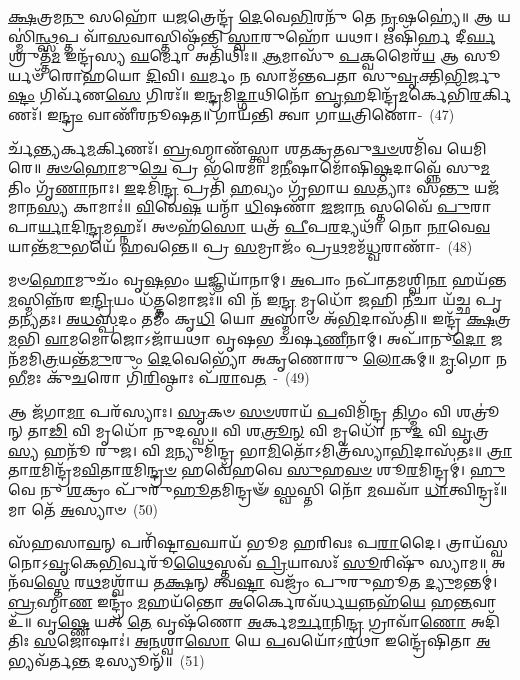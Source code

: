 \-\ul{𑌕𑍍𑌷}\-𑌤𑍍𑌰𑌮\-\ul{𑌨𑍁} 𑌸𑌹𑍋᳴ 𑌯\-\ul{𑌜}\-𑌤𑍍𑌰𑍇𑌨𑍍𑌦𑍍𑌰᳴ \ul{𑌦𑍇}\-𑌵𑍇\-\ul{𑌭𑌿}\-𑌰𑌨𑍁᳴ 𑌤𑍇 \ul{𑌨𑍃}\-𑌷𑌹𑍍𑌯𑍇॑॥ 𑌆 𑌯𑌸𑍍𑌮𑌿॑\-\ul{𑌨𑍍𑌥𑍍𑌸}\-𑌪𑍍𑌤 𑌵𑌾᳴\-\ul{𑌸}\-𑌵𑌾𑌸𑍍𑌤𑌿𑌷𑍍𑌠᳴𑌨𑍍𑌤𑌿 \ul{𑌸𑍍𑌵𑌾}\-𑌰𑍁𑌹𑍋᳴ 𑌯𑌥𑌾। 𑌋𑌷𑌿᳴𑌰𑍍\mbox{}𑌹 𑌦𑍀\-\ul{𑌰𑍍𑌘}\-𑌶𑍍𑌰𑍁𑌤𑍍𑌤᳴\-\ul{𑌮} 𑌇𑌨𑍍𑌦𑍍𑌰᳴𑌸𑍍𑌯 \ul{𑌘}\-𑌰𑍍𑌮𑍋 𑌅𑌤𑌿᳴𑌥𑌿𑌃॥ \ul{𑌆}\-𑌮𑌾𑌸𑍁᳴ \ul{𑌪}\-𑌕𑍍𑌵𑌮𑍈𑌰᳴\-\ul{𑌯} 𑌆 𑌸𑍂𑌰𑍍𑌯𑍞᳴ 𑌰𑍋𑌹𑌯𑍋 \ul{𑌦𑌿}\-𑌵𑌿। \ul{𑌘}\-𑌰𑍍𑌮𑌂 𑌨 𑌸𑌾𑌮᳴𑌨𑍍𑌤𑌪𑌤𑌾 𑌸𑍁\-\ul{𑌵𑍃}\-𑌕𑍍𑌤𑌿\-\ul{𑌭𑌿}\-𑌰𑍍𑌜𑍁\-\ul{𑌷𑍍𑌟𑌂} 𑌗𑌿𑌰𑍍𑌵᳴𑌣\-\ul{𑌸𑍇} 𑌗𑌿𑌰𑌃᳴॥ 𑌇\-\ul{𑌨𑍍𑌦𑍍𑌰}\-𑌮𑌿\-\ul{𑌦𑍍𑌗𑌾}\-𑌥𑌿𑌨𑍋᳴ \ul{𑌬𑍃}\-𑌹𑌦𑌿𑌨𑍍𑌦𑍍𑌰᳴\-\ul{𑌮}\-𑌰𑍍𑌕𑍇𑌭𑌿᳴\-\ul{𑌰}\-𑌰𑍍𑌕𑌿𑌣𑌃᳴। 𑌇\-\ul{𑌨𑍍𑌦𑍍𑌰𑌂} 𑌵𑌾𑌣𑍀᳴𑌰𑌨𑍂𑌷𑌤॥ 𑌗𑌾𑌯᳴𑌨𑍍𑌤𑌿 𑌤𑍍𑌵𑌾 𑌗𑌾\-\ul{𑌯}\-𑌤𑍍𑌰𑌿𑌣𑍋-~(47)

𑌰𑍍𑌚᳴\-\ul{𑌨𑍍𑌤𑍍𑌯}\-𑌰𑍍𑌕\-\ul{𑌮}\-𑌰𑍍𑌕𑌿𑌣𑌃᳴। \ul{𑌬𑍍𑌰}\-𑌹𑍍𑌮𑌾𑌣᳴𑌸𑍍𑌤𑍍𑌵𑌾 𑌶𑌤𑌕𑍍𑌰\-\ul{𑌤}\-𑌵𑍁\-\ul{𑌦𑍍𑌵}\-\-\ul{𑍞}\-𑌶𑌮𑌿᳴𑌵 𑌯𑍇𑌮𑌿𑌰𑍇॥ \ul{𑌅}\-\-\ul{𑍞}\-\-\ul{𑌹𑍋}\-𑌮𑍁\-\ul{𑌚𑍇} 𑌪𑍍𑌰 𑌭᳴𑌰𑍇𑌮𑌾 𑌮\-\ul{𑌨𑍀}\-𑌷𑌾𑌮𑍋᳴𑌷𑌿\-\ul{𑌷𑍍𑌠}\-𑌦𑌾𑌵𑍍𑌨𑍍𑌨𑍇᳴ 𑌸𑍁\-\ul{𑌮}\-𑌤𑌿𑌂 𑌗𑍃᳴\-\ul{𑌣𑌾}\-𑌨𑌾𑌃। \ul{𑌇}\-𑌦𑌮𑌿᳴\-\ul{𑌨𑍍𑌦𑍍𑌰} 𑌪𑍍𑌰𑌤𑌿᳴ \ul{𑌹}\-𑌵𑍍𑌯𑌂 𑌗𑍃᳴𑌭𑌾𑌯 \ul{𑌸}\-𑌤𑍍𑌯𑌾𑌃 𑌸᳴\-\ul{𑌨𑍍𑌤𑍁} 𑌯𑌜᳴𑌮𑌾𑌨\-\ul{𑌸𑍍𑌯} 𑌕𑌾𑌮𑌾𑌃॑॥ \ul{𑌵𑌿}\-𑌵𑍇\-\ul{𑌷} 𑌯𑌨𑍍𑌮𑌾᳴ \ul{𑌧𑌿}\-𑌷𑌣𑌾᳴ \ul{𑌜}\-𑌜𑌾\-\ul{𑌨} 𑌸𑍍𑌤𑌵𑍈᳴ \ul{𑌪𑍁}\-𑌰𑌾 𑌪𑌾\-\ul{𑌰𑍍𑌯𑌾}\-𑌦𑌿\-\ul{𑌨𑍍𑌦𑍍𑌰}\-𑌮𑌹𑍍𑌨𑌃᳴। 𑌅𑍞𑌹᳴\-\ul{𑌸𑍋} 𑌯𑌤𑍍𑌰᳴ \ul{𑌪𑍀}\-𑌪\-\ul{𑌰}\-𑌦𑍍𑌯𑌥𑌾᳴ 𑌨𑍋 \ul{𑌨𑌾}\-𑌵𑍇\-\ul{𑌵} 𑌯𑌾𑌨𑍍𑌤᳴\-\ul{𑌮𑍁}\-𑌭𑌯𑍇᳴ 𑌹𑌵𑌨𑍍𑌤𑍇॥ 𑌪𑍍𑌰 \ul{𑌸}\-𑌮𑍍𑌰𑌾𑌜𑌂᳴ 𑌪𑍍𑌰\-\ul{𑌥}\-𑌮𑌮᳴\-\ul{𑌧𑍍𑌵}\-𑌰𑌾𑌣𑌾᳴-~(48)

𑌮𑍞\-\ul{𑌹𑍋}\-𑌮𑍁𑌚𑌂᳴ 𑌵𑍃\-\ul{𑌷}\-𑌭𑌂 \ul{𑌯}\-𑌜𑍍𑌞𑌿𑌯𑌾᳴𑌨𑌾𑌮𑍍। \ul{𑌅}\-𑌪𑌾𑌂 𑌨𑌪𑌾᳴𑌤𑌮𑌶𑍍𑌵𑌿\-\ul{𑌨𑌾} 𑌹𑌯᳴𑌨𑍍𑌤\-\ul{𑌮}\-𑌸𑍍𑌮𑌿𑌨𑍍𑌨᳴𑌰 𑌇\-\ul{𑌨𑍍𑌦𑍍𑌰𑌿}\-𑌯𑌂 𑌧᳴\-\ul{𑌤𑍍𑌤}\-𑌮𑍋𑌜𑌃᳴॥ 𑌵𑌿 𑌨᳴ 𑌇\-\ul{𑌨𑍍𑌦𑍍𑌰} 𑌮𑍃𑌧𑍋᳴ 𑌜𑌹𑌿 \ul{𑌨𑍀}\-𑌚𑌾 𑌯᳴𑌚𑍍𑌛 𑌪𑍃𑌤\-\ul{𑌨𑍍𑌯}\-𑌤𑌃। \ul{𑌅}\-\-\ul{𑌧}\-\-\ul{𑌸𑍍𑌪}\-𑌦𑌂 𑌤𑌮𑍀𑌂॑ 𑌕𑍃\-\ul{𑌧𑌿} 𑌯𑍋 \ul{𑌅}\-𑌸𑍍𑌮𑌾𑍞 𑌅᳴\-\ul{𑌭𑌿}\-𑌦𑌾𑌸᳴𑌤𑌿॥ 𑌇𑌨𑍍𑌦𑍍𑌰᳴ \ul{𑌕𑍍𑌷}\-𑌤𑍍𑌰\-\ul{𑌮}\-𑌭𑌿 \ul{𑌵𑌾}\-𑌮𑌮𑍋𑌜𑍋\-𑌽𑌜𑌾᳴𑌯𑌥𑌾 𑌵𑍃𑌷𑌭 𑌚𑌰𑍍\mbox{}𑌷\-\ul{𑌣𑍀}\-𑌨𑌾𑌮𑍍। 𑌅𑌪𑌾᳴𑌨𑍁\-\ul{𑌦𑍋} 𑌜𑌨᳴𑌮𑌮𑌿\-\ul{𑌤𑍍𑌰}\-𑌯𑌨𑍍𑌤᳴\-\ul{𑌮𑍁}\-𑌰𑍁𑌂 \ul{𑌦𑍇}\-𑌵𑍇𑌭𑍍𑌯𑍋᳴ 𑌅𑌕𑍃𑌣𑍋𑌰𑍁 \ul{𑌲𑍋}\-𑌕𑌮𑍍॥ \ul{𑌮𑍃}\-𑌗𑍋 𑌨 \ul{𑌭𑍀}\-𑌮𑌃 𑌕𑍁᳴\-\ul{𑌚}\-𑌰𑍋 𑌗𑌿᳴\-\ul{𑌰𑌿}\-𑌷𑍍𑌠𑌾𑌃 𑌪᳴\-\ul{𑌰𑌾}\-𑌵\-\ul{𑌤}\-~-~(49)

𑌆 𑌜᳴𑌗𑌾\-\ul{𑌮𑌾} 𑌪𑌰᳴𑌸𑍍𑌯𑌾𑌃। \ul{𑌸𑍃}\-𑌕𑍞 \ul{𑌸}\-\-\ul{𑍞}\-𑌶𑌾𑌯᳴ \ul{𑌪}\-𑌵𑌿𑌮𑌿᳴𑌨𑍍𑌦𑍍𑌰 \ul{𑌤𑌿}\-𑌗𑍍𑌮𑌂 𑌵𑌿 𑌶𑌤𑍍𑌰𑍂॑𑌨𑍍 𑌤𑌾\-\ul{𑌢𑌿} 𑌵𑌿 𑌮𑍃𑌧𑍋᳴ 𑌨𑍁𑌦𑌸𑍍𑌵॥ 𑌵𑌿 𑌶\-\ul{𑌤𑍍𑌰𑍂}\-\-\ul{𑌨𑍍} 𑌵𑌿 𑌮𑍃𑌧𑍋᳴ 𑌨𑍁\-\ul{𑌦} 𑌵𑌿 \ul{𑌵𑍃}\-𑌤𑍍𑌰\-\ul{𑌸𑍍𑌯} 𑌹𑌨𑍂᳴ 𑌰𑍁𑌜। 𑌵𑌿 \ul{𑌮}\-𑌨𑍍𑌯𑍁𑌮𑌿᳴𑌨𑍍𑌦𑍍𑌰 𑌭𑌾\-\ul{𑌮𑌿}\-𑌤𑍋᳴\-𑌽𑌮𑌿𑌤𑍍𑌰᳴𑌸𑍍𑌯𑌾\-\ul{𑌭𑌿}\-𑌦𑌾𑌸᳴𑌤𑌃॥ \ul{𑌤𑍍𑌰𑌾}\-𑌤𑌾\-\ul{𑌰}\-𑌮𑌿𑌨𑍍𑌦𑍍𑌰᳴𑌮\-\ul{𑌵𑌿}\-𑌤𑌾\-\ul{𑌰}\-𑌮𑌿\-\ul{𑌨𑍍𑌦𑍍𑌰}\-\-\ul{𑍞} 𑌹𑌵𑍇᳴𑌹𑌵𑍇 \ul{𑌸𑍁}\-𑌹\-\ul{𑌵}\-\-\ul{𑍞} 𑌶𑍂\-\ul{𑌰}\-𑌮𑌿𑌨𑍍𑌦𑍍𑌰𑌮𑍍॑। \ul{𑌹𑍁}\-𑌵𑍇 𑌨𑍁 \ul{𑌶}\-𑌕𑍍𑌰𑌂 𑌪𑍁᳴𑌰𑍁\-\ul{𑌹𑍂}\-𑌤𑌮𑌿𑌨𑍍𑌦𑍍𑌰𑍟᳴ \ul{𑌸𑍍𑌵}\-𑌸𑍍𑌤𑌿 𑌨𑍋᳴ \ul{𑌮}\-𑌘𑌵𑌾᳴ \ul{𑌧𑌾}\-𑌤𑍍𑌵𑌿𑌨𑍍𑌦𑍍𑌰𑌃᳴॥ 𑌮𑌾 𑌤𑍇᳴ \ul{𑌅}\-𑌸𑍍𑌯𑌾𑍞~(50)

𑌸᳴𑌹𑌸𑌾\-\ul{𑌵}\-𑌨𑍍 𑌪𑌰𑌿᳴𑌷𑍍𑌟𑌾\-\ul{𑌵}\-𑌘𑌾𑌯᳴ 𑌭𑍂𑌮 𑌹𑌰𑌿𑌵𑌃 𑌪\-\ul{𑌰𑌾}\-𑌦𑍈। 𑌤𑍍𑌰𑌾𑌯᳴𑌸𑍍𑌵 𑌨𑍋\-𑌽\-\ul{𑌵𑍃}\-𑌕𑍇\-\ul{𑌭𑌿}\-𑌰𑍍𑌵𑌰𑍂᳴\-\ul{𑌥𑍈}\-𑌸𑍍𑌤𑌵᳴ \ul{𑌪𑍍𑌰𑌿}\-𑌯𑌾𑌸𑌃᳴ \ul{𑌸𑍂}\-𑌰𑌿𑌷𑍁᳴ 𑌸𑍍𑌯𑌾𑌮॥ 𑌅𑌨᳴𑌵\-\ul{𑌸𑍍𑌤𑍇} 𑌰\-\ul{𑌥}\-𑌮𑌶𑍍𑌵𑌾᳴𑌯 𑌤\-\ul{𑌕𑍍𑌷}\-𑌨𑍍 𑌤𑍍𑌵\-\ul{𑌷𑍍𑌟𑌾} 𑌵𑌜𑍍𑌰𑌂᳴ 𑌪𑍁𑌰𑍁𑌹𑍂𑌤 \ul{𑌦𑍍𑌯𑍁}\-𑌮𑌨𑍍𑌤𑌮𑍍॑। \ul{𑌬𑍍𑌰}\-𑌹𑍍𑌮𑌾\-\ul{𑌣} 𑌇𑌨𑍍𑌦𑍍𑌰𑌂᳴ \ul{𑌮}\-𑌹𑌯᳴𑌨𑍍𑌤𑍋 \ul{𑌅}\-𑌰𑍍𑌕𑍈𑌰𑌵᳴𑌰𑍍𑌧\-\ul{𑌯}\-𑌨𑍍𑌨𑌹᳴\-\ul{𑌯𑍇} 𑌹\-\ul{𑌨𑍍𑌤}\-𑌵𑌾 𑌉᳴॥ 𑌵𑍃\-\ul{𑌷𑍍𑌣𑍇} 𑌯𑌤𑍍 \ul{𑌤𑍇} 𑌵𑍃𑌷᳴𑌣𑍋 \ul{𑌅}\-𑌰𑍍𑌕𑌮\-\ul{𑌰𑍍𑌚𑌾}\-𑌨𑌿\-\ul{𑌨𑍍𑌦𑍍𑌰} 𑌗𑍍𑌰𑌾𑌵𑌾᳴\-\ul{𑌣𑍋} 𑌅𑌦𑌿᳴𑌤𑌿𑌃 \ul{𑌸}\-𑌜𑍋𑌷𑌾𑌃॑। \ul{𑌅}\-\-\ul{𑌨}\-𑌶𑍍𑌵𑌾\-\ul{𑌸𑍋} 𑌯𑍇 \ul{𑌪}\-𑌵𑌯𑍋᳴\-𑌽\-\ul{𑌰}\-𑌥𑌾 𑌇𑌨𑍍𑌦𑍍𑌰𑍇᳴𑌷𑌿𑌤𑌾 \ul{𑌅}\-𑌭𑍍𑌯𑌵᳴𑌰𑍍𑌤\-\ul{𑌨𑍍𑌤} 𑌦𑌸𑍍𑌯𑍂𑌨𑍍᳴॥~(51)

{\anuvakamend[{\-\ul{𑌵𑍃}\-\-\ul{𑌤𑍍𑌰}\-𑌹𑌤𑍍𑌯𑍇\-𑌽𑌨𑍁᳴ 𑌗𑌾\-\ul{𑌯}\-𑌤𑍍𑌰𑌿𑌣𑍋॑\-𑌽\-\ul{𑌧𑍍𑌵}\-𑌰𑌾𑌣𑌾𑌂॑ 𑌪\-\ul{𑌰𑌾}\-𑌵\-\ul{𑌤𑍋}\-\-𑌽𑌸𑍍𑌯𑌾\-\ul{𑌮}\-𑌷𑍍𑌟𑌾𑌚᳴𑌤𑍍𑌵𑌾𑌰𑌿𑍞𑌶𑌚𑍍𑌚}]}%
